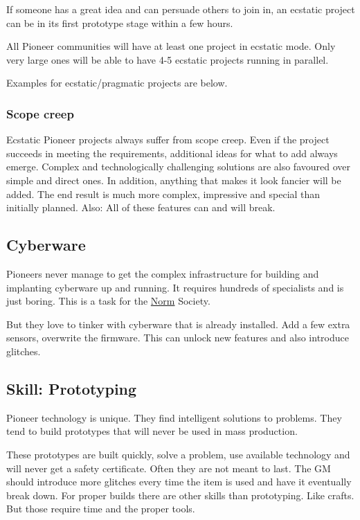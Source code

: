 If someone has a great idea and can persuade others to join in, an ecstatic project can be in its first prototype stage within a few hours.

All Pioneer communities will have at least one project in ecstatic mode. Only very large ones will be able to have 4-5 ecstatic projects running in parallel.

Examples for ecstatic/pragmatic projects are below.

\subsubsection{Scope creep}

Ecstatic Pioneer projects always suffer from scope creep. Even if the project succeeds in meeting the requirements, additional ideas for what to add always emerge. Complex and technologically challenging solutions are also favoured over simple and direct ones. In addition, anything that makes it look fancier will be added. The end result is much more complex, impressive and special than initially planned. Also: All of these features can and will break.

\subsection{Cyberware}
\label{sec:Cyberware Pioneers}

Pioneers never manage to get the complex infrastructure for building and implanting cyberware up and running. It requires hundreds of specialists and is just boring. This is a task for the \hyperref[sec:Cyberware Norm]{Norm} Society.

But they love to tinker with cyberware that is already installed. Add a few extra sensors, overwrite the firmware. This can unlock new features and also introduce glitches.


\subsection{Skill: Prototyping}
\label{sec:Prototyping skill}

Pioneer technology is unique. They find intelligent solutions to problems. They tend to build prototypes that will never be used in mass production.

These prototypes are built quickly, solve a problem, use available technology and will never get a safety certificate.
Often they are not meant to last.
The GM should introduce more glitches every time the item is used and have it eventually break down. For proper builds there are other skills than prototyping. Like crafts. But those require time and the proper tools.

